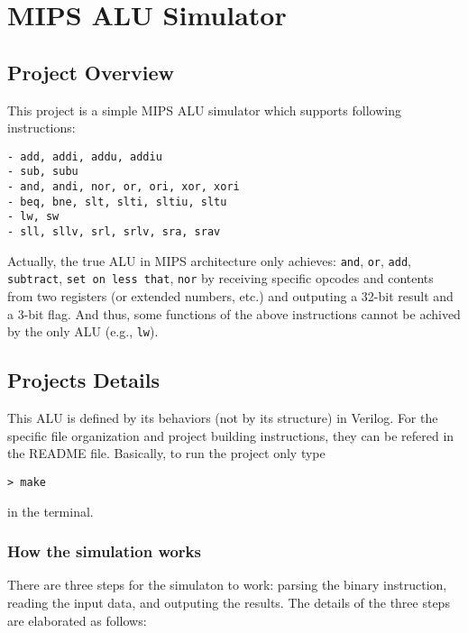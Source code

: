 \documentclass[
]{article}
\author{ZHANG Baozhe}
\date{\today}
\begin{document}
\hypertarget{header-n0}{%
\section{\texorpdfstring{MIPS ALU Simulator
}{MIPS ALU Simulator }}\label{header-n0}}

\hypertarget{header-n2}{%
\subsection{Project Overview}\label{header-n2}}

This project is a simple MIPS ALU simulator which supports following
instructions:

\begin{verbatim}
- add, addi, addu, addiu
- sub, subu
- and, andi, nor, or, ori, xor, xori
- beq, bne, slt, slti, sltiu, sltu
- lw, sw
- sll, sllv, srl, srlv, sra, srav
\end{verbatim}

Actually, the true ALU in MIPS architecture only achieves: \texttt{and},
\texttt{or}, \texttt{add}, \texttt{subtract},
\texttt{set\ on\ less\ that}, \texttt{nor} by receiving specific opcodes
and contents from two registers (or extended numbers, etc.) and
outputing a 32-bit result and a 3-bit flag. And thus, some functions of
the above instructions cannot be achived by the only ALU (e.g.,
\texttt{lw}).

\hypertarget{header-n13}{%
\subsection{Projects Details}\label{header-n13}}

This ALU is defined by its behaviors (not by its structure) in Verilog.
For the specific file organization and project building instructions,
they can be refered in the README file. Basically, to run the project only type 
\begin{verbatim}
> make
\end{verbatim}
in the terminal.

\hypertarget{header-n17}{%
\subsubsection{How the simulation works}\label{header-n17}}

There are three steps for the simulaton to work: parsing the binary
instruction, reading the input data, and outputing the results. The
details of the three steps are elaborated as follows:
\end{document}
